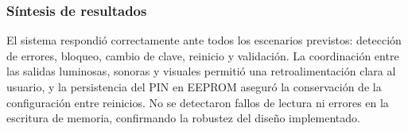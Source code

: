 \subsubsection{Síntesis de resultados}

El sistema respondió correctamente ante todos los escenarios previstos: 
detección de errores, bloqueo, cambio de clave, reinicio y validación.  
La coordinación entre las salidas luminosas, sonoras y visuales permitió una retroalimentación clara al usuario, 
y la persistencia del PIN en EEPROM aseguró la conservación de la configuración entre reinicios.  
No se detectaron fallos de lectura ni errores en la escritura de memoria, 
confirmando la robustez del diseño implementado.
